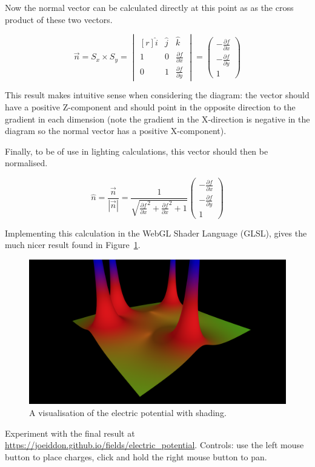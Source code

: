 \documentclass{article} %
\begin{document}
 Now the normal vector can be calculated directly at this point as as the cross product of these two vectors.

$$\vec{n} = S_x \times S_y = \begin{vmatrix*}[r]
\hat{i} & \hat{j} & \hat{k} \\
1 & 0 & \frac{\partial f}{\partial x} \\
0 & 1 & \frac{\partial f}{\partial y}
\end{vmatrix*} =
\begin{pmatrix}-\frac{\partial f}{\partial x} \\ -\frac{\partial f}{\partial y} \\ 1\end{pmatrix}
$$

This result makes intuitive sense when considering the diagram: the vector should have a positive Z-component and should point in the opposite direction to the gradient in each dimension (note the gradient in the X-direction is negative in the diagram so the normal vector has a positive X-component).

Finally, to be of use in lighting calculations, this vector should then be normalised.

$$\hat{n} = \frac{\vec{n}}{|\vec{n}|} =
\frac{1}{\sqrt{
    \frac{\partial f}{\partial x}^2 +
    \frac{\partial f}{\partial x}^2 +
    1
}}
\begin{pmatrix}-\frac{\partial f}{\partial x} \\ -\frac{\partial f}{\partial y} \\ 1\end{pmatrix}
$$

Implementing this calculation in the WebGL Shader Language (GLSL), gives the much nicer result found in Figure~\ref{fig:shading}.

\begin{figure}
\includegraphics[width=\linewidth]{shading.png}
\caption{A visualisation of the electric potential with shading.}
\label{fig:shading}
\end{figure}

\vfill
Experiment with the final result at \url{https://joeiddon.github.io/fields/electric_potential}. Controls: use the left mouse button to place charges, click and hold the right mouse button to pan.
\end{document}
